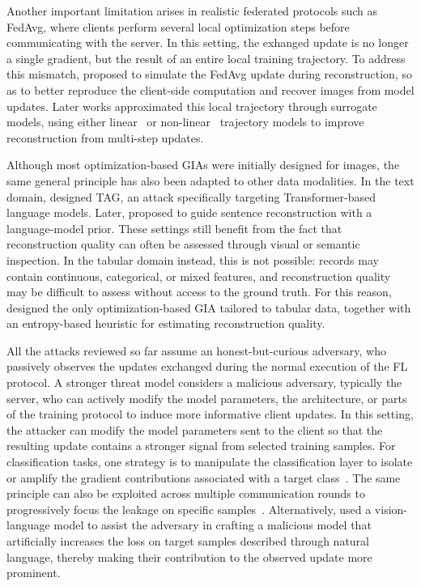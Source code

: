 Another important limitation arises in realistic federated protocols such as FedAvg, where clients perform several local optimization steps before communicating with the server. In this setting, the exhanged update is no longer a single gradient, but the result of an entire local training trajectory. To address this mismatch,  proposed to simulate the FedAvg update during reconstruction, so as to better reproduce the client-side computation and recover images from model updates. Later works approximated this local trajectory through surrogate models, using either linear~\cite{Zhu_sme_gia} or non-linear~\cite{xiaNonLinearTrajectoryModeling2025} trajectory models to improve reconstruction from multi-step updates.

Although most optimization-based GIAs were initially designed for images, the same general principle has also been adapted to other data modalities. In the text domain,  designed TAG, an attack specifically targeting Transformer-based language models. Later,  proposed to guide sentence reconstruction with a language-model prior. These settings still benefit from the fact that reconstruction quality can often be assessed through visual or semantic inspection. In the tabular domain instead, this is not possible: records may contain continuous, categorical, or mixed features, and reconstruction quality may be difficult to assess without access to the ground truth. For this reason,  designed the only optimization-based GIA tailored to tabular data, together with an entropy-based heuristic for estimating reconstruction quality.

All the attacks reviewed so far assume an honest-but-curious adversary, who passively observes the updates exchanged during the normal execution of the FL protocol. A stronger threat model considers a malicious adversary, typically the server, who can actively modify the model parameters, the architecture, or parts of the training protocol to induce more informative client updates. In this setting, the attacker can modify the model parameters sent to the client so that the resulting update contains a stronger signal from selected training samples. For classification tasks, one strategy is to manipulate the classification layer to isolate or amplify the gradient contributions associated with a target class~\cite{GradFiltClasswiseTargeted, wenFishingUserData2022a}. The same principle can also be exploited across multiple communication rounds to progressively focus the leakage on specific samples~\cite{wenFishingUserData2022a}. Alternatively,  used a vision-language model to assist the adversary in crafting a malicious model that artificially increases the loss on target samples described through natural language, thereby making their contribution to the observed update more prominent.

